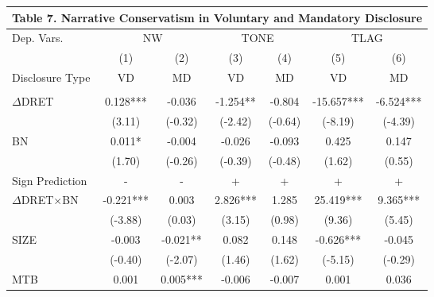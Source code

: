 \begin{table}[htbp] \label{T7PA}
  \centering
    \begin{tabular}{lcccccc}
    \multicolumn{7}{c}{\textbf{Table 7. Narrative Conservatism in Voluntary and Mandatory Disclosure}} \\
    \midrule
    \midrule
    Dep. Vars. & \multicolumn{2}{c}{NW} & \multicolumn{2}{c}{TONE} & \multicolumn{2}{c}{TLAG} \\
    \cmidrule{2-7}
      & (1) & \multicolumn{1}{c}{(2)} & (3) & \multicolumn{1}{c}{(4)} & (5) & \multicolumn{1}{c}{(6)} \\
    Disclosure Type & VD & MD & VD & MD & VD & MD \\
    \midrule
      &   & \multicolumn{1}{c}{} &   & \multicolumn{1}{c}{} &   & \multicolumn{1}{c}{} \\
    $\Delta$DRET & 0.128*** & \multicolumn{1}{c}{-0.036} & -1.254** & \multicolumn{1}{c}{-0.804} & -15.657*** & \multicolumn{1}{c}{-6.524***} \\
      & (3.11) & \multicolumn{1}{c}{(-0.32)} & (-2.42) & \multicolumn{1}{c}{(-0.64)} & (-8.19) & \multicolumn{1}{c}{(-4.39)} \\
    BN & 0.011* & \multicolumn{1}{c}{-0.004} & -0.026 & \multicolumn{1}{c}{-0.093} & 0.425 & \multicolumn{1}{c}{0.147} \\
      & (1.70) & \multicolumn{1}{c}{(-0.26)} & (-0.39) & \multicolumn{1}{c}{(-0.48)} & (1.62) & \multicolumn{1}{c}{(0.55)} \\
    \rowcolor[rgb]{ .933,  .925,  .882} Sign Prediction & - & - & + & + & + & + \\
    \rowcolor[rgb]{ .933,  .925,  .882} $\Delta$DRET$\times$BN & -0.221*** & \multicolumn{1}{c}{0.003} & 2.826*** & \multicolumn{1}{c}{1.285} & 25.419*** & \multicolumn{1}{c}{9.365***} \\
    \rowcolor[rgb]{ .933,  .925,  .882}   & (-3.88) & \multicolumn{1}{c}{(0.03)} & (3.15) & \multicolumn{1}{c}{(0.98)} & (9.36) & \multicolumn{1}{c}{(5.45)} \\
    SIZE & -0.003 & \multicolumn{1}{c}{-0.021**} & 0.082 & \multicolumn{1}{c}{0.148} & -0.626*** & \multicolumn{1}{c}{-0.045} \\
      & (-0.40) & \multicolumn{1}{c}{(-2.07)} & (1.46) & \multicolumn{1}{c}{(1.62)} & (-5.15) & \multicolumn{1}{c}{(-0.29)} \\
    MTB & 0.001 & \multicolumn{1}{c}{0.005***} & -0.006 & \multicolumn{1}{c}{-0.007} & 0.001 & \multicolumn{1}{c}{0.036} \\

\end{tabular}
\end{table}
